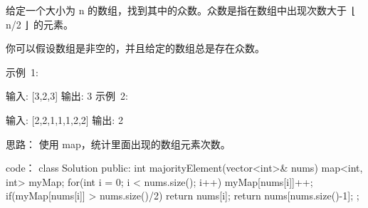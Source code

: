 给定一个大小为 n 的数组，找到其中的众数。众数是指在数组中出现次数大于 ⌊ n/2 ⌋ 的元素。

你可以假设数组是非空的，并且给定的数组总是存在众数。

示例 1:

输入: [3,2,3]
输出: 3
示例 2:

输入: [2,2,1,1,1,2,2]
输出: 2



























思路：
使用 map，统计里面出现的数组元素次数。


























code：
class Solution {
public:
    int majorityElement(vector<int>& nums) {
        map<int, int> myMap;
        for(int i = 0; i < nums.size(); i++)
        {
            myMap[nums[i]]++;
            if(myMap[nums[i]] > nums.size()/2)
                return nums[i];
        }
        return nums[nums.size()-1];
    }
};